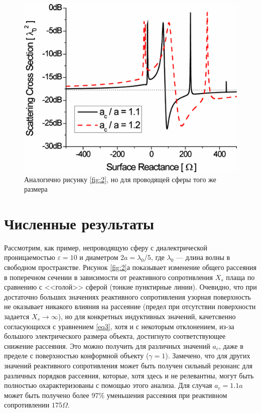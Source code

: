 \documentclass[12pt,a4paper]{article}
\begin{document}
\begin{figure}[t]
  \centering
  \includegraphics[height=0.15\paperheight, width=0.4\paperwidth]{4.png}
  \caption{Аналогично рисунку \ref{fig:2}, но для проводящей сферы того же размера}
  \label{fig:4}
\end{figure}

\section{Численные результаты}
Рассмотрим, как пример, непроводящую сферу с диалектрической проницаемостью $\varepsilon=10$ 
и диаметром $2a=\lambda_0/5$, где $\lambda_0$ --- длина волны в свободном пространстве. 
Рисунок \ref{fig:2}а показывает изменение общего рассеяния в поперечном сечении в 
зависимости от реактивного сопротивления $X_s$ плаща по сравнению с <<голой>> сферой
(тонкие пунктирные линии). Очевидно, что при достаточно больших значениях реактивного 
сопротивления узорная поверхность не оказывает никакого влияния на рассеяние (предел при
отсутствии поверхности задается $X_s \to \infty$), но для конкретных индуктивных значений,
качетсвенно согласующихся с уравнением \ref{eq3}, хотя и с некоторым отклонением, из-за
большого электрического размера объекта, достигнуто соответствующее снижение рассеяния.
Это можно получить для различных значений $a_c$, даже в пределе с поверхностью конформной
объекту ($\gamma=1$). Замечено, что для других значений реактивного сопротивления может
быть получен сильный резонанс для различных порядков рассеяния, которые, хотя здесь и не
релевантны, могут быть полностью охарактеризованы с помощью этого анализа. Для случая
$a_c=1.1a$ может быть получено более 97\% уменьшения рассеяния при реактивном сопротивлении
$175\Omega$.
\end{document}
